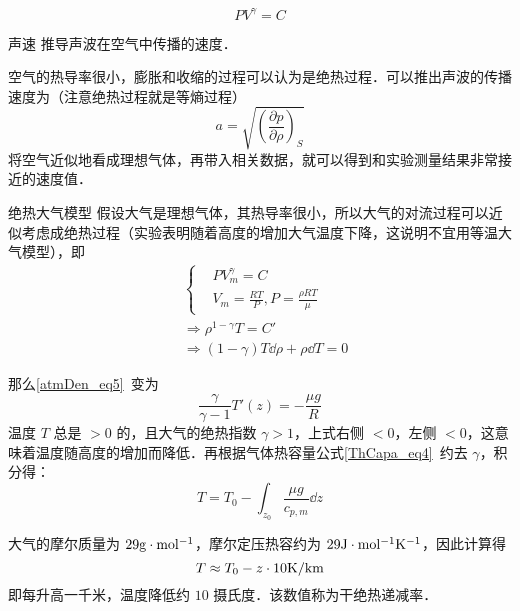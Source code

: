 \begin{equation}
P V^\gamma = C
\end{equation}

\begin{example}{声速}
推导声波在空气中传播的速度．

空气的热导率很小，膨胀和收缩的过程可以认为是绝热过程．可以推出声波的传播速度为（注意绝热过程就是等熵过程）
\begin{equation}
a=\sqrt{\left(\frac{\partial p}{\partial \rho}\right)_S}
\end{equation}
将空气近似地看成理想气体，再带入相关数据，就可以得到和实验测量结果非常接近的速度值．
\end{example}
\begin{example}{绝热大气模型}
假设大气是理想气体，其热导率很小，所以大气的对流过程可以近似考虑成绝热过程（实验表明随着高度的增加大气温度下降，这说明不宜用等温大气模型），即
\begin{equation}
\begin{aligned}
&\begin{cases}
&PV_m^\gamma=C\\
&V_m=\frac{RT}{P},P=\frac{\rho R T}{\mu}
\end{cases}
\\
&\Rightarrow \rho^{1-\gamma}T=C'\\
&\Rightarrow (1-\gamma)T\dd \rho+\rho\dd T=0  
\end{aligned}
\end{equation}

那么\autoref{atmDen_eq5}~变为
\begin{equation}
\frac{\gamma}{\gamma-1}T'(z)=-\frac{\mu g}{R}
\end{equation}
温度 $T$ 总是 $>0$ 的，且大气的绝热指数 $\gamma>1$，上式右侧 $<0$，左侧 $<0$，这意味着温度随高度的增加而降低．再根据气体热容量公式\autoref{ThCapa_eq4}~约去 $\gamma$，积分得：
\begin{equation}\label{Adiab_eq6}
T=T_0-\int_{z_0}\frac{\mu g}{c_{p,m}} \dd z 
\end{equation}

大气的摩尔质量为 $29 \rm{g\cdot mol^{-1}}$，摩尔定压热容约为 $29 \rm{J\cdot mol^{-1}K^{-1}}$，因此计算得
\begin{equation}
T\approx T_0-z\cdot 10 \rm{K/km}
\end{equation}
即每升高一千米，温度降低约 $10$ 摄氏度．该数值称为干绝热递减率．
\end{example}
